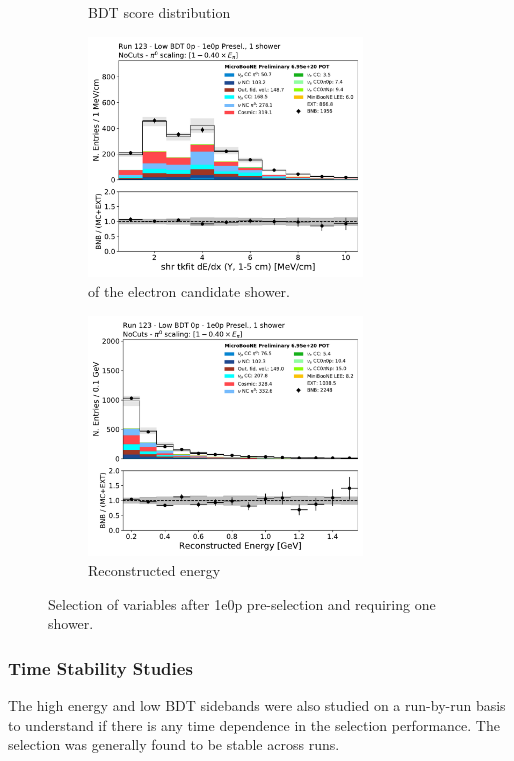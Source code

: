 \begin{figure}[H]
\begin{subfigure}{0.48\textwidth}
    \caption{BDT score distribution}
    \end{subfigure}
    \begin{subfigure}{0.48\textwidth}
    \includegraphics[width=0.8\textwidth]{1e0p/Low_BDT_Sideband/shr_tkfit_gap10_dedx_Y.pdf}
    \caption{\dedx of the electron candidate shower.}
    \end{subfigure}
    \begin{subfigure}{0.48\textwidth}
    \includegraphics[width=0.8\textwidth]{1e0p/Low_BDT_Sideband/reco_e_note.pdf}
    \caption{Reconstructed energy}
    \end{subfigure}
    \caption{Selection of variables after 1e0p pre-selection and requiring one shower.} 
    \label{fig:low_0pbdt_sideband_plots}
\end{figure}
\subsubsection{Time Stability Studies}
The high energy and low BDT sidebands were also studied on a run-by-run basis to understand if there is any time dependence in the selection performance. The selection was generally found to be stable across runs. 

